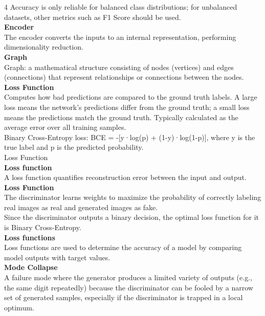 \documentclass[8pt]{extarticle}
\begin{document}
\begin{multicols}{4}
Accuracy is only reliable for balanced class distributions; for unbalanced datasets, other metrics such as F1 Score should be used.\\
\vspace{2pt}\textbf{Encoder}\\
The encoder converts the inputs to an internal representation, performing dimensionality reduction.\\
\vspace{2pt}\textbf{Graph}\\
Graph: a mathematical structure consisting of nodes (vertices) and edges (connections) that represent relationships or connections between the nodes.\\
\vspace{2pt}\textbf{Loss Function}\\
Computes how bad predictions are compared to the ground truth labels. A large loss means the network's predictions differ from the ground truth; a small loss means the predictions match the ground truth. Typically calculated as the average error over all training samples.\\
Binary Cross-Entropy loss: BCE = -[y·log(p) + (1-y)·log(1-p)], where y is the true label and p is the predicted probability.\\
Loss Function\\
\vspace{2pt}\textbf{Loss function}\\
A loss function quantifies reconstruction error between the input and output.\\
\vspace{2pt}\textbf{Loss Function}\\
The discriminator learns weights to maximize the probability of correctly labeling real images as real and generated images as fake.\\
Since the discriminator outputs a binary decision, the optimal loss function for it is Binary Cross-Entropy.\\
\vspace{2pt}\textbf{Loss functions}\\
Loss functions are used to determine the accuracy of a model by comparing model outputs with target values.\\
\vspace{2pt}\textbf{Mode Collapse}\\
A failure mode where the generator produces a limited variety of outputs (e.g., the same digit repeatedly) because the discriminator can be fooled by a narrow set of generated samples, especially if the discriminator is trapped in a local optimum.\\


\end{multicols}
\end{document}

